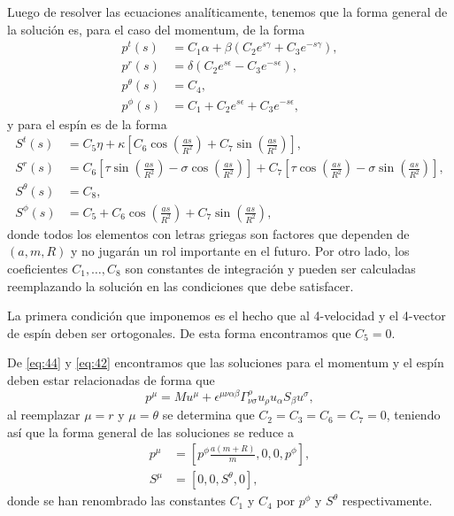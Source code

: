 Luego de resolver las ecuaciones analíticamente, tenemos que la forma general de la solución es, para el caso del momentum, de la forma
\begin{align}
p^t(s) &= C_1 \alpha + \beta \left( C_2 e^{s \gamma} + C_3 e^{-s \gamma} \right),\\
p^r(s) &= \delta \left( C_2 e^{s \epsilon} - C_3 e^{-s \epsilon} \right),\\
p^{\theta}(s) &= C_4,\\
p^{\phi}(s) &= C_1 + C_2 e^{s \epsilon} + C_3 e^{-s \epsilon},
\end{align}
y para el espín es de la forma
\begin{align}
S^t(s) &= C_5 \eta + \kappa \left[ C_6 \cos\left(\frac{as}{R^2} \right) + C_7 \sin\left(\frac{as}{R^2} \right) \right],\\
S^r(s) &= C_6 \left[ \tau \sin\left(\frac{as}{R^2} \right) - \sigma \cos\left(\frac{as}{R^2} \right) \right] 
+ C_7 \left[ \tau \cos\left(\frac{as}{R^2} \right) - \sigma \sin\left(\frac{as}{R^2} \right) \right],\\
S^{\theta}(s) &= C_8,\\
S^{\phi}(s) &= C_5 + C_6 \cos\left(\frac{as}{R^2} \right) + C_7 \sin\left(\frac{as}{R^2} \right),
\end{align}
donde todos los elementos con letras griegas son factores que dependen de $(a,m,R)$ y no jugarán un rol importante en el futuro. Por otro lado, los coeficientes $C_1, \dots, C_8$ son constantes de integración y pueden ser calculadas reemplazando la solución en las condiciones que debe satisfacer.

La primera condición que imponemos es el hecho que al 4-velocidad y el 4-vector de espín deben ser ortogonales. De esta forma encontramos que $C_5=0$.

De \eqref{eq:44} y \eqref{eq:42} encontramos que las soluciones para el momentum y el espín deben estar relacionadas de forma que
\begin{equation}
p^{\mu} = M u^{\mu} + \epsilon^{\mu \nu \alpha \beta} \Gamma^{\rho}_{\nu \sigma} u_{\rho} u_{\alpha} S_{\beta} u^{\sigma},
\end{equation}
al reemplazar $\mu=r$ y $\mu=\theta$ se determina que $C_2 = C_3 = C_6 = C_7 = 0$, teniendo así que la forma general de las soluciones se reduce a 
\begin{align}
\label{eq:73}
p^{\mu} &= \left[ p^{\phi} \frac{a(m+R)}{m}, 0, 0, p^{\phi} \right],\\
\label{eq:74}
S^{\mu} &= \left[ 0,0,S^{\theta},0 \right],
\end{align}
donde se han renombrado las constantes $C_1$ y $C_4$ por $p^{\phi}$ y $S^{\theta}$ respectivamente.

